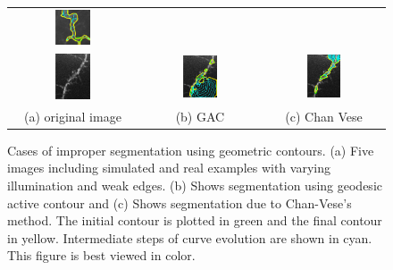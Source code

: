 \begin{figure}[t]
\begin{tabular}{@{}ccc@{}}
\includegraphics[width=0.3\textwidth]{images/L2S_compare/CV_4}	\\
\includegraphics[width=0.3\textwidth]{images/L2S_compare/orig_5}	&
\includegraphics[width=0.3\textwidth]{images/L2S_compare/GAC_5}	&
\includegraphics[width=0.3\textwidth]{images/L2S_compare/CV_5}	\\
(a) original image & (b) GAC & (c) Chan Vese
\end{tabular}
\caption[Geometric Snakes: negative examples]{Cases of improper segmentation using geometric contours. (a) Five images including simulated and real examples with varying illumination and weak edges. (b) Shows segmentation using geodesic active contour and (c) Shows segmentation due to Chan-Vese's method. The initial contour is plotted in green and the final contour in yellow. Intermediate steps of curve evolution are shown in cyan. This figure is best viewed in color.}
\label{fig:ls_compare}
\end{figure}
